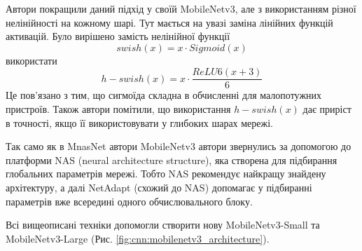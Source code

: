Автори покращили даний підхід у своїй MobileNetv3, але з використанням
різної нелінійності на кожному шарі. Тут мається на увазі заміна лінійних функцій активацій.
Було вирішено замість нелінійної функції
\begin{equation}
    swish(x) = x·Sigmoid(x)
\end{equation}
використати
\begin{equation}
    h-swish(x) = x·\frac{ReLU6(x + 3)}{6}
\end{equation}
Це пов'язано з тим, що сигмоїда складна в обчисленні
для малопотужних пристроїв.
Також автори помітили, що використання $h-swish(x)$ дає приріст в точності, якщо її
використовувати у глибоких шарах мережі.

Так само як в MnasNet автори MobileNetv3 автори звернулись за допомогою до платформи NAS (neural
architecture structure), яка створена для  підбирання глобальних параметрів мережі.
Тобто NAS рекомендує найкращу знайдену архітектуру, а далі NetAdapt (схожий до NAS) допомагає у підбиранні
параметрів вже всередині одного обчислювального блоку.

Всі вищеописані техніки допомогли створити нову MobileNetv3-Small та MobileNetv3-Large
(Рис. \ref{fig:cnn:mobilenetv3_architecture}).

